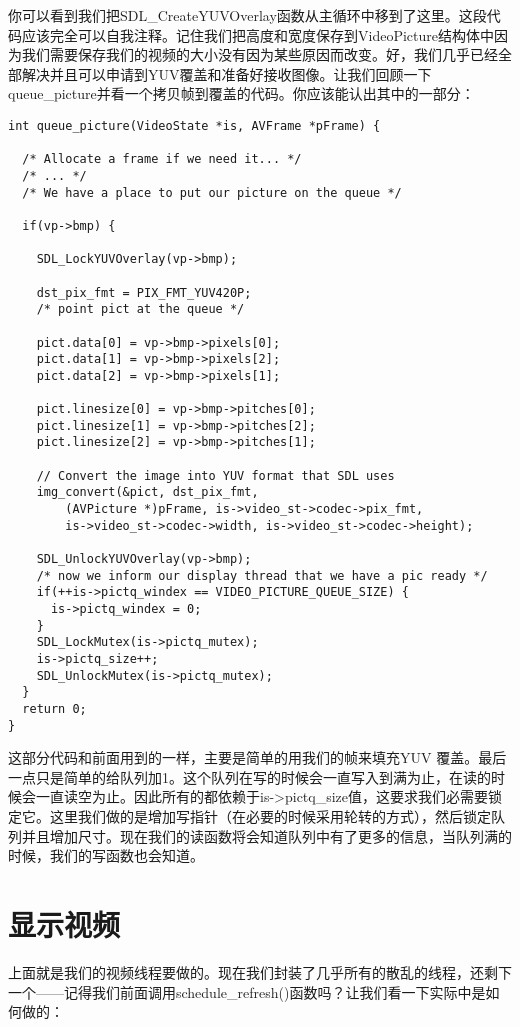 你可以看到我们把SDL_CreateYUVOverlay函数从主循环中移到了这里。这段代码应该完全可以自我注释。记住我们把高度和宽度保存到VideoPicture结构体中因为我们需要保存我们的视频的大小没有因为某些原因而改变。好，我们几乎已经全部解决并且可以申请到YUV覆盖和准备好接收图像。让我们回顾一下queue_picture并看一个拷贝帧到覆盖的代码。你应该能认出其中的一部分：
\begin{lstlisting}
int queue_picture(VideoState *is, AVFrame *pFrame) {

  /* Allocate a frame if we need it... */
  /* ... */
  /* We have a place to put our picture on the queue */

  if(vp->bmp) {

    SDL_LockYUVOverlay(vp->bmp);

    dst_pix_fmt = PIX_FMT_YUV420P;
    /* point pict at the queue */

    pict.data[0] = vp->bmp->pixels[0];
    pict.data[1] = vp->bmp->pixels[2];
    pict.data[2] = vp->bmp->pixels[1];

    pict.linesize[0] = vp->bmp->pitches[0];
    pict.linesize[1] = vp->bmp->pitches[2];
    pict.linesize[2] = vp->bmp->pitches[1];

    // Convert the image into YUV format that SDL uses
    img_convert(&pict, dst_pix_fmt,
        (AVPicture *)pFrame, is->video_st->codec->pix_fmt,
        is->video_st->codec->width, is->video_st->codec->height);

    SDL_UnlockYUVOverlay(vp->bmp);
    /* now we inform our display thread that we have a pic ready */
    if(++is->pictq_windex == VIDEO_PICTURE_QUEUE_SIZE) {
      is->pictq_windex = 0;
    }
    SDL_LockMutex(is->pictq_mutex);
    is->pictq_size++;
    SDL_UnlockMutex(is->pictq_mutex);
  }
  return 0;
}
\end{lstlisting}


这部分代码和前面用到的一样，主要是简单的用我们的帧来填充YUV 覆盖。最后一点只是简单的给队列加1。这个队列在写的时候会一直写入到满为止，在读的时候会一直读空为止。因此所有的都依赖于is->pictq_size值，这要求我们必需要锁定它。这里我们做的是增加写指针（在必要的时候采用轮转的方式），然后锁定队列并且增加尺寸。现在我们的读函数将会知道队列中有了更多的信息，当队列满的时候，我们的写函数也会知道。

\section{显示视频}
上面就是我们的视频线程要做的。现在我们封装了几乎所有的散乱的线程，还剩下一个——记得我们前面调用schedule_refresh()函数吗？让我们看一下实际中是如何做的：

